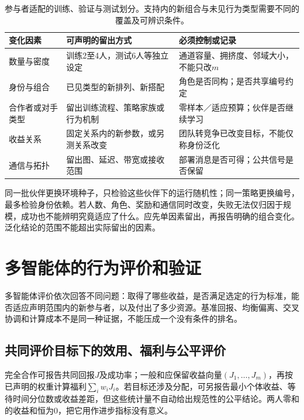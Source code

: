 \begin{table}[htbp]
 \centering
 \begin{tabularx}{\linewidth}{@{}l >{\raggedright\arraybackslash}X >{\raggedright\arraybackslash}X@{}}
 \toprule
 变化因素 & 可声明的留出方式 & 必须控制或记录\\
 \midrule
 数量与密度 & 训练2至4人，测试6人等独立设定 & 通道容量、拥挤度、邻域大小，不能只改$m$\\
 身份与组合 & 已见类型的新排列、新搭配 & 角色是否同构；是否共享编号约定\\
 合作者或对手类型 & 留出训练流程、策略家族或行为机制 & 零样本／适应预算；伙伴是否继续学习\\
 收益关系 & 固定关系内的新参数，或另测关系改变 & 团队转竞争已改变目标，不能仅称身份泛化\\
 通信与拓扑 & 留出图、延迟、带宽或接收范围 & 部署消息是否可得；公共信号是否保留\\
 \bottomrule
 \end{tabularx}
 \caption{参与者适配的训练、验证与测试划分。支持内的新组合与未见行为类型需要不同的覆盖及可辨识条件。}
 \label{tab:rl-multi-agent-splits}
\end{table}

同一批伙伴更换环境种子，只检验这些伙伴下的运行随机性；同一策略更换编号，最多检验身份依赖。若人数、角色、奖励和通信同时改变，失败无法仅归因于规模，成功也不能辨明究竟适应了什么。应先单因素留出，再报告明确的组合变化。泛化结论的范围不能超出实际留出的因素。

\section{多智能体的行为评价和验证}
\label{sec:rl-multi-agent-evaluation}

多智能体评价依次回答不同问题：取得了哪些收益，是否满足选定的行为标准，能否适应声明范围内的新参与者，以及付出了多少资源。基准回报、均衡偏离、交叉协调和计算成本不是同一种证据，不能压成一个没有条件的排名。

\subsection{共同评价目标下的效用、福利与公平评价}
\label{sec:rl-multi-agent-welfare}

完全合作可报告共同回报$J$及成功率；一般和应保留收益向量$(J_1,\ldots,J_m)$，再按已声明的权重计算福利$\sum_iw_iJ_i$。若目标还涉及分配，可另报告最小个体收益、等待时间分位数或收益差距，但这些统计量不自动给出规范性的公平结论。两人零和的收益和恒为0，把它用作进步指标没有意义。


